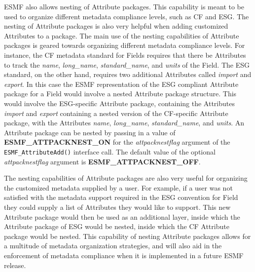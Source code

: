 \vspace{18pt}

\vspace{18pt}

ESMF also allows nesting of Attribute packages.  This capability is meant to be used to organize different metadata compliance levels, such as CF and ESG.  The nesting of Attribute packages is also very helpful when adding customized Attributes to a package.  The main use of the nesting capabilities of Attribute packages is geared towards organizing different metadata compliance levels.  For instance, the CF metadata standard for Fields requires that there be Attributes to track the {\it name}, {\it long\_name}, {\it standard\_name}, and {\it units} of the Field.  The ESG standard, on the other hand, requires two additional Attributes called {\it import} and {\it export}.  In this case the ESMF representation of the ESG compliant Attribute package for a Field would involve a nested Attribute package structure.  This would involve the ESG-specific Attribute package, containing the Attributes {\it import} and {\it export} containing a nested version of the CF-specific Attribute package, with the Attributes {\it name}, {\it long\_name}, {\it standard\_name}, and {\it units}.  An Attribute package can be nested by passing in a value of {\bf ESMF\_ATTPACKNEST\_ON} for the {\it attpacknestflag} argument of the {\tt ESMF\_AttributeAdd()} interface call.  The default value of the optional {\it attpacknestflag} argument is {\bf ESMF\_ATTPACKNEST\_OFF}.

The nesting capabilities of Attribute packages are also very useful for organizing the customized metadata supplied by a user.  For example, if a user was not satisfied with the metadata support required in the ESG convention for Field they could supply a list of Attributes they would like to support.  This new Attribute package would then be used as an additional layer, inside which the Attribute package of ESG would be nested, inside which the CF Attribute package would be nested.  This capability of nesting Attribute packages allows for a multitude of metadata organization strategies, and will also aid in the enforcement of metadata compliance when it is implemented in a future ESMF release.



